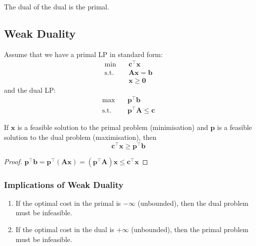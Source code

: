\documentclass{article}
\begin{document}
\begin{theorem}
    The dual of the dual is the primal.
\end{theorem}





\subsection{Weak Duality}
Assume that we have a primal LP in standard form: \begin{align*}
    \min \quad & \mathbf{c}^{\top} \mathbf{x} \\ 
    \text{s.t.} \quad & \mathbf{Ax} = \mathbf{b} \\ 
    & \mathbf{x} \geq \mathbf{0}
\end{align*} and the dual LP: \begin{align*}
    \max \quad & \mathbf{p}^{\top} \mathbf{b} \\ 
    \text{s.t.} \quad & \mathbf{p}^{\top}\mathbf{A} \leq \mathbf{c}
\end{align*}
\begin{theorem}
    If $ \mathbf{x}$ is a feasible solution to the primal problem (minimisation) and $ \mathbf{p}$ is a feasible solution to the dual problem (maximisation), then \begin{equation}
        \mathbf{c}^{\top} \mathbf{x} \geq \mathbf{p}^{\top}\mathbf{b} 
    \end{equation}
\end{theorem}

\begin{proof}
    $ \mathbf{p}^{\top} \mathbf{b} = \mathbf{p}^{\top}\left( \mathbf{Ax} \right) = \left( \mathbf{p}^{\top}\mathbf{A} \right)\mathbf{x} \leq \mathbf{c}^{\top}\mathbf{x}$
\end{proof}

\subsubsection{Implications of Weak Duality}

\begin{theorem}
    \begin{enumerate}
        \item If the optimal cost in the primal is $-\infty$ (unbounded), then the dual problem must be infeasible. 
        \item If the optimal cost in the dual is $+\infty$ (unbounded), then the primal problem must be infeasible. 
    \end{enumerate}
\end{theorem}
\end{document}
